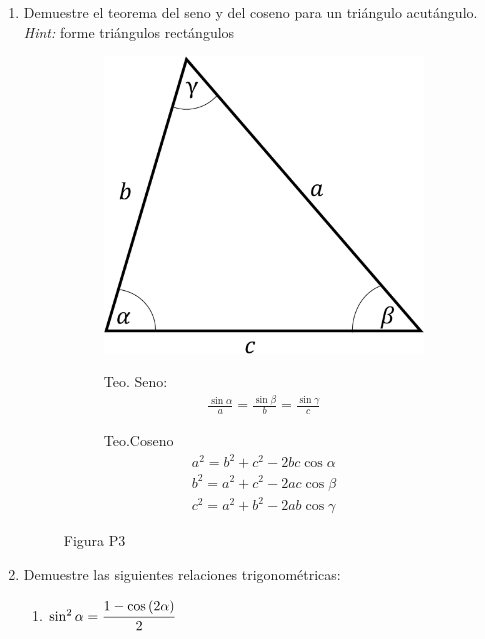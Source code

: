 \documentclass[letterpaper,11pt]{article}
\begin{document}
\begin{enumerate}
\item Demuestre el teorema del seno y del coseno para un triángulo acutángulo.\\
\textit{Hint:} forme triángulos rectángulos

\begin{figure}[H]
    \centering
    \begin{subfigure}[t]{0.4\textwidth}
        \centering
        \includegraphics[width=0.6\linewidth]{2021-1/Imagenes/aux0/acutangulo.pdf}
    \end{subfigure}
    \hspace{0.5cm}
    \begin{subfigure}[t]{0.4\textwidth}
        \vspace{-4cm}
        Teo. Seno:
        \begin{align*}
            \frac{\sin{\alpha}}{a} = \frac{\sin{\beta}}{b} = \frac{\sin{\gamma}}{c}
        \end{align*}
        
        Teo.Coseno
        \begin{align*}
            a^2 = b^2 + c^2 - 2bc \cos{\alpha}\\
            b^2 = a^2 + c^2 - 2ac \cos{\beta}\\
            c^2 = a^2 + b^2 - 2ab \cos{\gamma}
        \end{align*}
    \end{subfigure}
    \caption*{Figura P3}
\end{figure}

\item Demuestre las siguientes relaciones trigonométricas:
    {
    \begin{multicols}{2}
        \begin{enumerate}
        \item $\sin^2\alpha = \cfrac{1 - \cos{(2\alpha)}}{2}$
        

\end{enumerate}
\end{multicols}}
\end{enumerate}
\end{document}
